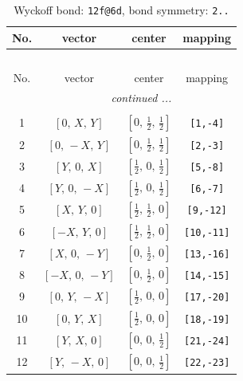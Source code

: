 \documentclass[fleqn,8pt]{jsarticle}
\begin{document}
\renewcommand{\arraystretch}{1.2}
\begin{longtable}{cccc}
\caption{Wyckoff bond: {\tt 12f@6d}, bond symmetry: {\tt 2..}}
 \\
 \hline \hline
No. & vector & center & mapping \\ \hline \endfirsthead

\multicolumn{3}{l}{\tablename\ \thetable{}} \\
 \hline \hline
No. & vector & center & mapping \\ \hline \endhead

 \hline \hline
\multicolumn{3}{r}{\footnotesize\it continued ...} \\ \endfoot

 \hline \hline
\multicolumn{3}{r}{} \\ \endlastfoot

1 & $\left[ 0,\, X,\, Y \right]$ & $\left[ 0,\, \frac{1}{2},\, \frac{1}{2} \right]$ & {\tt [1,-4]} \\ \hline
2 & $\left[ 0,\, - X,\, Y \right]$ & $\left[ 0,\, \frac{1}{2},\, \frac{1}{2} \right]$ & {\tt [2,-3]} \\ \hline
3 & $\left[ Y,\, 0,\, X \right]$ & $\left[ \frac{1}{2},\, 0,\, \frac{1}{2} \right]$ & {\tt [5,-8]} \\ \hline
4 & $\left[ Y,\, 0,\, - X \right]$ & $\left[ \frac{1}{2},\, 0,\, \frac{1}{2} \right]$ & {\tt [6,-7]} \\ \hline
5 & $\left[ X,\, Y,\, 0 \right]$ & $\left[ \frac{1}{2},\, \frac{1}{2},\, 0 \right]$ & {\tt [9,-12]} \\ \hline
6 & $\left[ - X,\, Y,\, 0 \right]$ & $\left[ \frac{1}{2},\, \frac{1}{2},\, 0 \right]$ & {\tt [10,-11]} \\ \hline
7 & $\left[ X,\, 0,\, - Y \right]$ & $\left[ 0,\, \frac{1}{2},\, 0 \right]$ & {\tt [13,-16]} \\ \hline
8 & $\left[ - X,\, 0,\, - Y \right]$ & $\left[ 0,\, \frac{1}{2},\, 0 \right]$ & {\tt [14,-15]} \\ \hline
9 & $\left[ 0,\, Y,\, - X \right]$ & $\left[ \frac{1}{2},\, 0,\, 0 \right]$ & {\tt [17,-20]} \\ \hline
10 & $\left[ 0,\, Y,\, X \right]$ & $\left[ \frac{1}{2},\, 0,\, 0 \right]$ & {\tt [18,-19]} \\ \hline
11 & $\left[ Y,\, X,\, 0 \right]$ & $\left[ 0,\, 0,\, \frac{1}{2} \right]$ & {\tt [21,-24]} \\ \hline
12 & $\left[ Y,\, - X,\, 0 \right]$ & $\left[ 0,\, 0,\, \frac{1}{2} \right]$ & {\tt [22,-23]} \\
\end{longtable}
\end{document}
